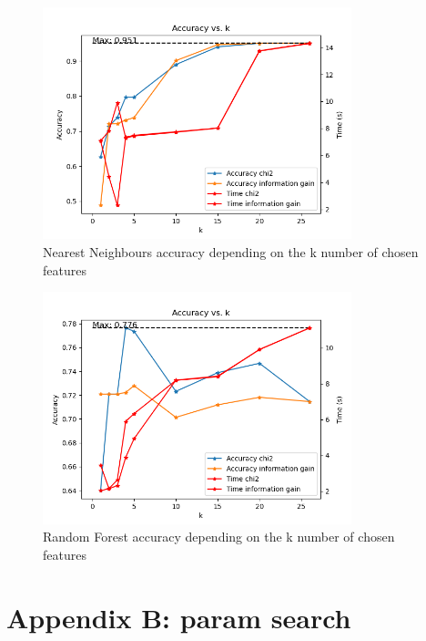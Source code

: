 \documentclass{article}
\begin{document}
    \begin{figure}[H]
        \centering
        \includegraphics[width=0.8\textwidth]{report_img/k_search/nearest_neighbors}
        \caption{Nearest Neighbours accuracy depending on the k number of chosen features}
        \label{fig:}
    \end{figure}

    \begin{figure}[H]
        \centering
        \includegraphics[width=0.8\textwidth]{report_img/k_search/random_forest}
        \caption{Random Forest accuracy depending on the k number of chosen features}
        \label{fig:}
    \end{figure}


    \section{Appendix B: param search}\label{sec:appendixB}
\end{document}
